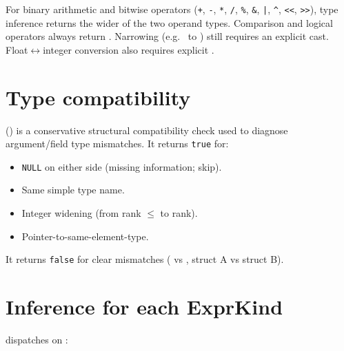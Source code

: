 \pnum
For binary arithmetic and bitwise operators (\texttt{+}, \texttt{-}, \texttt{*},
\texttt{/}, \texttt{\%}, \texttt{\&}, \texttt{|}, \texttt{\^{}},
\texttt{<<}, \texttt{>>}), type inference returns the wider of the two
operand types.  Comparison and logical operators always return .
Narrowing (e.g.\  to ) still requires an explicit
 cast.  Float$\leftrightarrow$integer conversion also requires
explicit .

\section{Type compatibility}
\label{sec:tc-compat}

\pnum
{} () is a
conservative structural compatibility check used to diagnose argument/field type
mismatches.  It returns \texttt{true} for:
\begin{itemize}
\item \texttt{NULL} on either side (missing information; skip).
\item Same simple type name.
\item Integer widening (from rank $\leq$ to rank).
\item Pointer-to-same-element-type.
\end{itemize}
It returns \texttt{false} for clear mismatches ( vs ,
struct A vs struct B).

\section{Inference for each ExprKind}
\label{sec:tc-exprkind}

\pnum
{} dispatches on :

